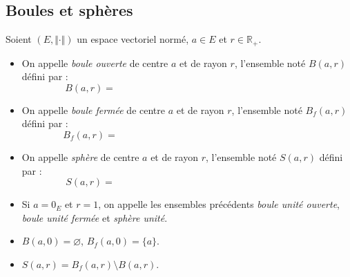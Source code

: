 \documentclass[french,11pt,twoside]{VcCours}
\begin{document}
\subsection{Boules et sphères}
\begin{Definition}{} Soient $(E, \Vert \cdot \Vert)$ un espace vectoriel normé, $a \in E$ et $r \in \mathbb{R}_+$.

\begin{itemize}
\item On appelle \emph{boule ouverte} de centre $a$ et de rayon $r$, l'ensemble noté $B(a,r)$ défini par :
$$ B(a,r) = \phantom{\lbrace x \in E, \, d(x,a)<r \rbrace =  \lbrace x \in E, \, \Vert x-a \Vert <r \rbrace}$$
\item On appelle \emph{boule fermée} de centre $a$ et de rayon $r$, l'ensemble noté $B_f(a,r)$ défini par :
$$ B_f(a,r) = \phantom{\lbrace x \in E, \, d(x,a) \leq r \rbrace =  \lbrace x \in E, \, \Vert x-a \Vert \leq r \rbrace}$$
\item On appelle \emph{sphère} de centre $a$ et de rayon $r$, l'ensemble noté $S(a,r)$ défini par :
$$ S(a,r) = \phantom{\lbrace x \in E, \, d(x,a) = r \rbrace =  \lbrace x \in E, \, \Vert x-a \Vert = r \rbrace}$$
\item Si $a=0_E$ et $r=1$, on appelle les ensembles précédents \emph{boule unité ouverte}, \emph{boule unité fermée} et \emph{sphère unité}. 
\end{itemize}
\end{Definition}

\begin{Remarques}{}
\begin{itemize}
\item $B(a,0) = \varnothing$, $B_f(a,0) = \lbrace a \rbrace$.
\item $S(a,r)= B_f(a,r) \setminus B(a,r)$.
\end{itemize}
\end{Remarques}{}

\medskip
\end{document}
